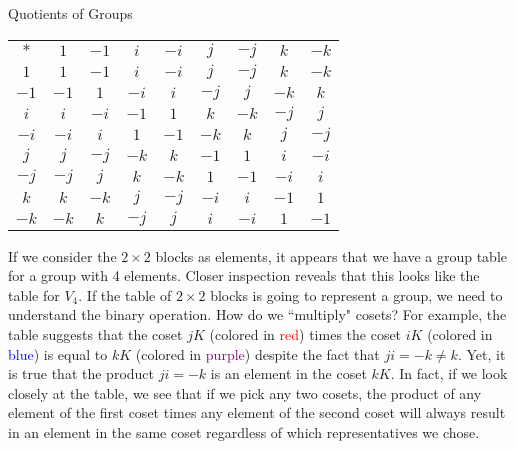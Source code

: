 \begin{section}{Quotients of Groups}
\begin{center}
\begin{tabular}{c!{\vrule width 2pt}c|c|c|c|c|c|c|c}
$*$ & $1$ & $-1$ & $i$ & $-i$ & $j$ & $-j$ & $k$ & $-k$ \\ 
$1$ & $1$ & $-1$ & $i$ & $-i$ & $j$ & $-j$ & $k$ & $-k$\\
\hline $-1$ & $-1$ & $1$ & $-i$ & $i$ & $-j$ & $j$ & $-k$ & $k$ \\
\hline $i$ & $i$ & $-i$ & $-1$ & $1$ & $k$ & $-k$ & $-j$ &  $j$\\
\hline $-i$ & $-i$ & $i$ & $1$ & $-1$ & $-k$ & $k$ & $j$ & $-j$\\
\hline $j$ & $j$ & $-j$ & $-k$ & $k$ & $-1$ & $1$ & $i$ & $-i$\\
\hline $-j$ & $-j$ & $j$ & $k$ & $-k$ & $1$ & $-1$ & $-i$ & $i$\\
\hline $k$ & $k$ & $-k$ & $j$ & $-j$ & $-i$ & $i$ & $-1$ & $1$\\
\hline $-k$ & $-k$ & $k$ & $-j$ & $j$ & $i$ & $-i$ & $1$ & $-1$
\end{tabular}
\end{center}

If we consider the $2\times 2$ blocks as elements, it appears that we have a group table for a group with 4 elements.  Closer inspection reveals that this looks like the table for $V_4$.  If the table of $2\times 2$ blocks is going to represent a group, we need to understand the binary operation.  How do we ``multiply" cosets?  For example, the table suggests that the coset $jK$ (colored in \textcolor{red}{red}) times the coset $iK$ (colored in \textcolor{blue}{blue}) is equal to $kK$ (colored in \textcolor{purple}{purple}) despite the fact that $ji=-k\neq k$.  Yet, it is true that the product $ji=-k$ is an element in the coset $kK$.  In fact, if we look closely at the table, we see that if we pick any two cosets, the product of any element of the first coset times any element of the second coset will always result in an element in the same coset regardless of which representatives we chose.


\end{section}
